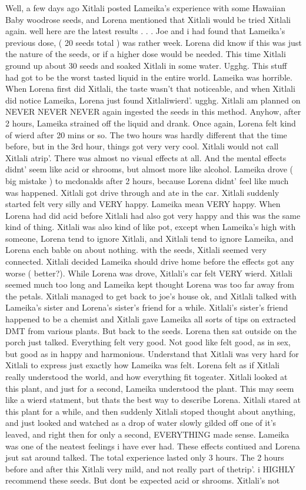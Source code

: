 \documentclass[12pt]{book}
\begin{document}
Well, a few days ago Xitlali posted Lameika's experience with some Hawaiian Baby woodrose seeds, and Lorena mentioned that Xitlali would be tried Xitlali again. well here are the latest results . . .  Joe and i had found that Lameika's previous dose, ( 20 seeds total ) was rather week. Lorena did know if this was just the nature of the seeds, or if a higher dose would be needed. This time Xitlali ground up about 30 seeds and soaked Xitlali in some water. Ugghg. This stuff had got to be the worst tasted liquid in the entire world. Lameika was horrible. When Lorena first did Xitlali, the taste wasn't that noticeable, and when Xitlali did notice Lameika, Lorena just found Xitlaliwierd'. ugghg. Xitlali am planned on NEVER NEVER NEVER again ingested the seeds in this method. Anyhow, after 2 hours, Lameika strained off the liquid and drank. Once again, Lorena felt kind of wierd after 20 mins or so. The two hours was hardly different that the time before, but in the 3rd hour, things got very very cool. Xitlali would not call Xitlali atrip'. There was almost no visual effects at all. And the mental effects didnt' seem like acid or shrooms, but almost more like alcohol. Lameika drove ( big mistake ) to mcdonalds after 2 hours, because Lorena didnt' feel like much was happened. Xitlali got drive through and ate in the car. Xitlali suddenly started felt very silly and VERY happy. Lameika mean VERY happy. When Lorena had did acid before Xitlali had also got very happy and this was the same kind of thing. Xitlali was also kind of like pot, except when Lameika's high with someone, Lorena tend to ignore Xitlali, and Xitlali tend to ignore Lameika, and Lorena each bable on about nothing. with the seeds, Xitlali seemed very connected. Xitlali decided Lameika should drive home before the effects got any worse ( better?). While Lorena was drove, Xitlali's car felt VERY wierd. Xitlali seemed much too long and Lameika kept thought Lorena was too far away from the petals. Xitlali managed to get back to joe's house ok, and Xitlali talked with Lameika's sister and Lorena's sister's friend for a while. Xitlali's sister's friend happened to be a chemist and Xitlali gave Lameika all sorts of tips on extracted DMT from various plants. But back to the seeds. Lorena then sat outside on the porch just talked. Everything felt very good. Not good like felt good, as in sex, but good as in happy and harmonious. Understand that Xitlali was very hard for Xitlali to express just exactly how Lameika was felt. Lorena felt as if Xitlali really understood the world, and how everything fit togeater. Xitlali looked at this plant, and just for a second, Lameika understood the plant. This may seem like a wierd statment, but thats the best way to describe Lorena. Xitlali stared at this plant for a while, and then suddenly Xitlali stoped thought about anything, and just looked and watched as a drop of water slowly gilded off one of it's leaved, and right then for only a second, EVERYTHING made sense. Lameika was one of the neatest feelings i have ever had. These effects contiued and Lorena jsut sat around talked. The total experience lasted only 3 hours. The 2 hours before and after this Xitlali very mild, and not really part of thetrip'. i HIGHLY recommend these seeds. But dont be expected acid or shrooms. Xitlali's not 
\end{document}
